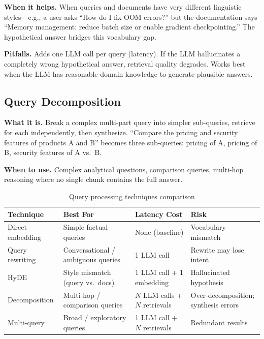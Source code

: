 \textbf{When it helps.} When queries and documents have very different linguistic styles---e.g., a user asks ``How do I fix OOM errors?'' but the documentation says ``Memory management: reduce batch size or enable gradient checkpointing.'' The hypothetical answer bridges this vocabulary gap.

\textbf{Pitfalls.} Adds one LLM call per query (latency). If the LLM hallucinates a completely wrong hypothetical answer, retrieval quality degrades. Works best when the LLM has reasonable domain knowledge to generate plausible answers.

\subsection{Query Decomposition}

\textbf{What it is.} Break a complex multi-part query into simpler sub-queries, retrieve for each independently, then synthesize. ``Compare the pricing and security features of products A and B'' becomes three sub-queries: pricing of A, pricing of B, security features of A vs.\ B.

\textbf{When to use.} Complex analytical questions, comparison queries, multi-hop reasoning where no single chunk contains the full answer.

\begin{table}[H]
\centering
\caption{Query processing techniques comparison}
\begin{tabularx}{\textwidth}{lXXX}
\toprule
\textbf{Technique} & \textbf{Best For} & \textbf{Latency Cost} & \textbf{Risk} \\
\midrule
Direct embedding & Simple factual queries & None (baseline) & Vocabulary mismatch \\
Query rewriting & Conversational / ambiguous queries & 1 LLM call & Rewrite may lose intent \\
HyDE & Style mismatch (query vs.\ docs) & 1 LLM call + 1 embedding & Hallucinated hypothesis \\
Decomposition & Multi-hop / comparison queries & $N$ LLM calls + $N$ retrievals & Over-decomposition; synthesis errors \\
Multi-query & Broad / exploratory queries & 1 LLM call + $N$ retrievals & Redundant results \\
\bottomrule
\end{tabularx}
\end{table}

